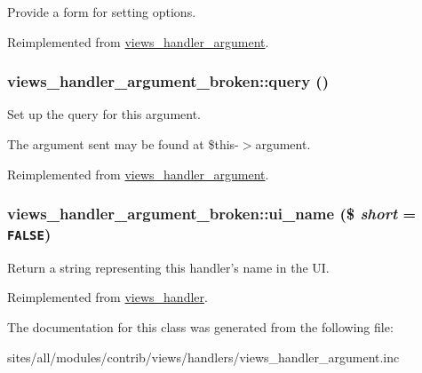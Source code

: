 Provide a form for setting options. 

Reimplemented from \hyperlink{classviews__handler__argument_44f015a0d527983ae6df2689f66b2c24}{views\_\-handler\_\-argument}.\hypertarget{classviews__handler__argument__broken_271044cef8ae5bc6c058ba98ab0fb56d}{
\subsubsection[{query}]{\setlength{\rightskip}{0pt plus 5cm}views\_\-handler\_\-argument\_\-broken::query ()}}
\label{classviews__handler__argument__broken_271044cef8ae5bc6c058ba98ab0fb56d}


Set up the query for this argument.

The argument sent may be found at \$this-$>$argument. 

Reimplemented from \hyperlink{classviews__handler__argument_c4b0ce6704a10f515b2aea2f9e790994}{views\_\-handler\_\-argument}.\hypertarget{classviews__handler__argument__broken_c62b831ae47250571ae7449906c1687d}{
\subsubsection[{ui\_\-name}]{\setlength{\rightskip}{0pt plus 5cm}views\_\-handler\_\-argument\_\-broken::ui\_\-name (\$ {\em short} = {\tt FALSE})}}
\label{classviews__handler__argument__broken_c62b831ae47250571ae7449906c1687d}


Return a string representing this handler's name in the UI. 

Reimplemented from \hyperlink{classviews__handler_e81019ed08d9c3f5bca3d16c69e7b39f}{views\_\-handler}.

The documentation for this class was generated from the following file:\begin{CompactItemize}
\item 
sites/all/modules/contrib/views/handlers/views\_\-handler\_\-argument.inc\end{CompactItemize}
